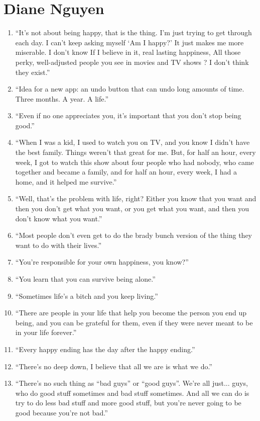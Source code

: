 \documentclass{book}
\numberwithin{equation}{section}
\begin{document}
\section{Diane Nguyen}
\begin{enumerate}
    \item ``It's not about being happy, that is the thing. I'm just trying to get through each day. I can't keep asking myself `Am I happy?' It just makes me more miserable. I don't know If I believe in it, real lasting happiness, All those perky, well-adjusted people you see in movies and TV shows ? I don't think they exist.''
    \item ``Idea for a new app: an undo button that can undo long amounts of time. Three months. A year. A life.''
    \item ``Even if no one appreciates you, it's important that you don't stop being good.''
    \item ``When I was a kid, I used to watch you on TV, and you know I didn't have the best family. Things weren't that great for me. But, for half an hour, every week, I got to watch this show about four people who had nobody, who came together and became a family, and for half an hour, every week, I had a home, and it helped me survive.''
    \item ``Well, that's the problem with life, right? Either you know that you want and then you don't get what you want, or you get what you want, and then you don't know what you want.''
    \item ``Most people don't even get to do the brady bunch version of the thing they want to do with their lives.''
    \item ``You're responsible for your own happiness, you know?''
    \item ``You learn that you can survive being alone.''
    \item ``Sometimes life's a bitch and you keep living.''
    \item ``There are people in your life that help you become the person you end up being, and you can be grateful for them, even if they were never meant to be in your life forever.''
    \item ``Every happy ending has the day after the happy ending.''
    \item ``There's no deep down, I believe that all we are is what we do.''
    \item ``There's no such thing as ``bad guys'' or ``good guys''. We're all just... guys, who do good stuff sometimes and bad stuff sometimes. And all we can do is try to do less bad stuff and more good stuff, but you're never going to be good because you're not bad.''
\end{enumerate}
\end{document}
